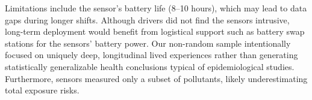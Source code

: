 

Limitations include the sensor’s battery life (8–10 hours), which may lead to data gaps during longer shifts.
Although drivers did not find the sensors intrusive, long-term deployment would benefit from logistical support such as battery swap stations for the sensors' battery power.
Our non-random sample intentionally focused on uniquely deep, longitudinal lived experiences rather than generating statistically generalizable health conclusions typical of epidemiological studies.
Furthermore, sensors measured only a subset of pollutants, likely underestimating total exposure risks.
